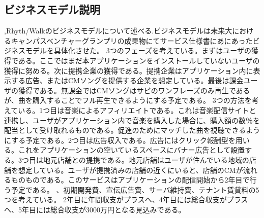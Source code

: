 \subsection{ビジネスモデル説明}
,Rhyth/Walkのビジネスモデルについて述べる.ビジネスモデルは未来大におけるキャンパスベンチャーグランプリの成果物にてサービス仕様書にあにあったビジネスモデルを具体化させた。
3つのフェーズを考えている。まずはユーザの獲得である。ここではまだ本アプリケーションをインストールしていないユーザの獲得に努める。次に提携企業の獲得である。提携企業はアプリケーション内に表示する広告、またはCMソングを提供する企業を想定している。最後は課金ユーザの獲得である。無課金ではCMソングはサビのワンフレーズのみ再生であるが、曲を購入することでフル再生できるようにする予定である。
3つの方法を考えている。1つ目は音楽によるアフィリエイトである。これは音楽配信サイトと連携し、ユーザがアプリケーション内で音楽を購入した場合に、購入額の数％を配当として受け取れるものである。促進のためにマッチした曲を視聴できるようにする予定である。2つ目は広告収入である。広告にはクリック報酬型を用いる。これをアプリケーションの空いているスペースにバナー広告として設置する。3つ目は地元店舗との提携である。地元店舗はユーザが住んでいる地域の店舗を想定している。ユーザが提携済みの店舗の近くにいると、店舗のCMが流れるものものである。このサービスはアプリケーションの配信開始から2年目で行う予定である。
、初期開発費、宣伝広告費、サーバ維持費、テナント賃貸料の5つを考えている。
2年目に年間収支がプラスへ、4年目には総合収支がプラスへ、5年目には総合収支が3000万円となる見込みである。
